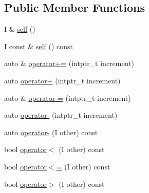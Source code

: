 \subsection*{Public Member Functions}
\begin{DoxyCompactItemize}
\item 
I \& \mbox{\hyperlink{structrah_1_1iterator__facade_3_01_i_00_01_r_00_01std_01_1_1random__access__iterator__tag_01_4_a9890aae591eb465ddb7cbc3db9fc6218}{self}} ()
\item 
I const  \& \mbox{\hyperlink{structrah_1_1iterator__facade_3_01_i_00_01_r_00_01std_01_1_1random__access__iterator__tag_01_4_a8c4e4f5eb14eec47622cee38dcfd07ec}{self}} () const
\item 
auto \& \mbox{\hyperlink{structrah_1_1iterator__facade_3_01_i_00_01_r_00_01std_01_1_1random__access__iterator__tag_01_4_a402cdbd9f04329b426493ad03a310e9b}{operator+=}} (intptr\+\_\+t increment)
\item 
auto \mbox{\hyperlink{structrah_1_1iterator__facade_3_01_i_00_01_r_00_01std_01_1_1random__access__iterator__tag_01_4_afe60d943be2c52381038c8466d19d10c}{operator+}} (intptr\+\_\+t increment)
\item 
auto \& \mbox{\hyperlink{structrah_1_1iterator__facade_3_01_i_00_01_r_00_01std_01_1_1random__access__iterator__tag_01_4_adb8fa0019d3c70c3aeac51fb4b3979ea}{operator-\/=}} (intptr\+\_\+t increment)
\item 
auto \mbox{\hyperlink{structrah_1_1iterator__facade_3_01_i_00_01_r_00_01std_01_1_1random__access__iterator__tag_01_4_a1e4f51ffa6ad59080d730e2f2f729f72}{operator-\/}} (intptr\+\_\+t increment)
\item 
auto \mbox{\hyperlink{structrah_1_1iterator__facade_3_01_i_00_01_r_00_01std_01_1_1random__access__iterator__tag_01_4_ad4cd9ec1ee01da50455721636b9388dc}{operator-\/}} (I other) const
\item 
bool \mbox{\hyperlink{structrah_1_1iterator__facade_3_01_i_00_01_r_00_01std_01_1_1random__access__iterator__tag_01_4_a87b6e1c4e4791b8e092923798d075a1e}{operator$<$}} (I other) const
\item 
bool \mbox{\hyperlink{structrah_1_1iterator__facade_3_01_i_00_01_r_00_01std_01_1_1random__access__iterator__tag_01_4_a000bab93b6f148c784d7ec1a189cfd57}{operator$<$=}} (I other) const
\item 
bool \mbox{\hyperlink{structrah_1_1iterator__facade_3_01_i_00_01_r_00_01std_01_1_1random__access__iterator__tag_01_4_aa2d1ab12b4e18c684e1aa27eb59fa98a}{operator$>$}} (I other) const
\item 

\end{DoxyCompactItemize}
